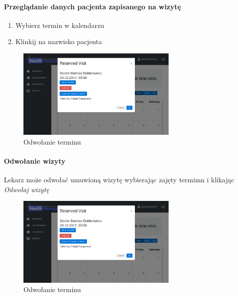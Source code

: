 \documentclass[polish,12pt]{aghthesis}
\begin{document}
     \paragraph{Przeglądanie danych pacjenta zapisanego na wizytę}{
        \begin{enumerate}
          \item Wybierz termin w kalendarzu
          \item Klinkij na nazwisko pacjenta
        \end{enumerate}
        \begin{figure}[H]
        \includegraphics[width=0.7\textwidth]{gui-doc-enrolled}
        \caption{Odwołanie terminu}
        \end{figure}  
    }
     \paragraph{Odwołanie wizyty}{
     Lekarz może odwołać umuwioną wizytę wybierając zajęty termimn i klikając \emph{Odwołaj wizytę}
        \begin{figure}[H]
        \includegraphics[width=0.7\textwidth]{gui-doc-enrolled}
        \caption{Odwołanie terminu}
        \end{figure}  
    }
\end{document}
